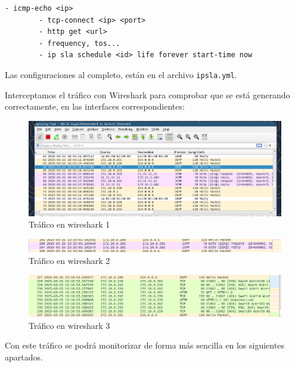 \documentclass[11pt]{article}
\begin{document}
\begin{tcolorbox}[
    boxrule=0pt,
    title=Formato de ip sla dependiendo de la acción ,
]
    \begin{lstlisting}[gobble=6]
        - icmp-echo <ip>
        - tcp-connect <ip> <port>
        - http get <url>
        - frequency, tos...
        - ip sla schedule <id> life forever start-time now
    \end{lstlisting}
\end{tcolorbox}

Las configuraciones al completo, están en el archivo \texttt{ipsla.yml}.

Interceptamos el tráfico con Wireshark para comprobar que se está generando correctamente, en las interfaces correspondientes:

\begin{figure}[h]
    \centering
    \includegraphics[width=\textwidth]{src/icmp1.png}
    \caption{Tráfico en wireshark 1}
\end{figure}
\begin{figure}[h]
    \centering
    \includegraphics[width=\textwidth]{src/icmp2.png}
    \caption{Tráfico en wireshark 2}
\end{figure}
\begin{figure}[h]
    \centering
    \includegraphics[width=\textwidth]{src/http1.png}
    \caption{Tráfico en wireshark 3}
\end{figure}


Con este tráfico se podrá monitorizar de forma más sencilla en los siguientes apartados.


\clearpage
\end{document}
